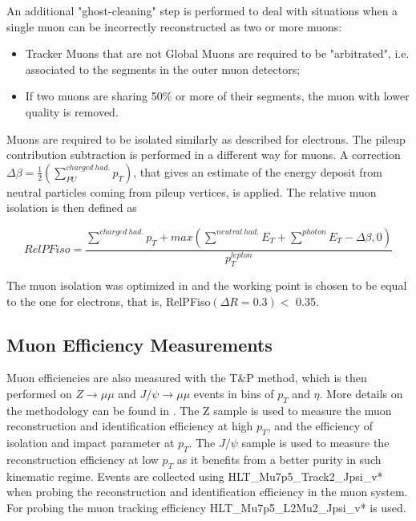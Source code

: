An additional "ghost-cleaning" step is performed to deal with situations when a single muon can be incorrectly reconstructed as two or more muons:
\begin{itemize}
	\item Tracker Muons that are not Global Muons are required to be "arbitrated", i.e. associated to the segments in the outer muon detectors;
	\item If two muons are sharing 50$\%$ or more of their segments, the muon with lower quality is removed.
\end{itemize}

Muons are required to be isolated similarly as described for electrons. The pileup contribution subtraction is performed in a different way for muons. A correction $\Delta \beta = \frac{1}{2}(\sum_{PU}^{charged~had.} p_{T})$, that gives an estimate of the energy deposit from neutral particles coming from pileup vertices, is applied. The relative muon isolation is then defined as 

\begin{equation}
RelPFiso = \frac{\sum^{charged~had.} p_{T} + max(\sum^{neutral~had.} E_{T} + \sum^{photon} E_{T} - \Delta \beta, 0)}{p_{T}^{lepton}}
\end{equation}

The muon isolation was optimized in \cite{bib:CMS-AN-15-277} and the working point is chosen to be equal to the one for electrons, that is, RelPFiso$(\Delta R = 0.3)<$ 0.35.

\subsection{Muon Efficiency Measurements}
Muon efficiencies are also measured with the T$\&$P method, which is then performed on $Z \rightarrow \mu\mu$ and $J/\psi \rightarrow \mu\mu$ events in bins of $p_{T}$ and $\eta$. More details on the methodology can be found in \cite{bib:CMS-AN-15-277}. The Z sample is used to measure the muon reconstruction and identification efficiency at high $p_{T}$, and the efficiency of isolation and impact parameter at $p_{T}$. The $J/\psi$ sample is used to measure the reconstruction efficiency at low $p_{T}$ as it benefits from a better purity in such kinematic regime. Events are collected using HLT\_Mu7p5\_Track2\_Jpsi\_v* when probing the reconstruction and identification efficiency in the muon system. For probing the muon tracking efficiency HLT\_Mu7p5\_L2Mu2\_Jpsi\_v* is used.

